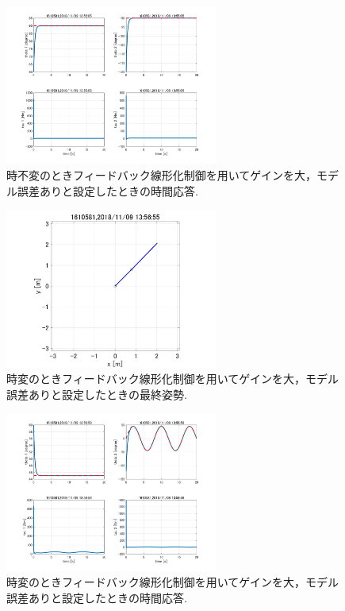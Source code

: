 \documentclass[twocolumn, 10pt,a4j]{jsarticle}
\begin{document}
    \begin{figure}[H]
      \begin{center}
        \includegraphics[width=7cm]{../img/img/kansetu_FB_zifuhen_large_yes_model_gosa_zikan_auto.jpg}
        \caption{時不変のときフィードバック線形化制御を用いてゲインを大，モデル誤差ありと設定したときの時間応答.}
      \end{center}
    \end{figure}

    \begin{figure}[H]
      \begin{center}
        \includegraphics[width=7cm]{../img/img/kansetu_FB_zihen_large_yes_model_gosa_saisyu_sisei.jpg}
        \caption{時変のときフィードバック線形化制御を用いてゲインを大，モデル誤差ありと設定したときの最終姿勢.}
      \end{center}
    \end{figure}
    
    \begin{figure}[H]
      \begin{center}
        \includegraphics[width=7cm]{../img/img/kansetu_FB_zihen_large_yes_model_gosa_zikan_auto.jpg}
        \caption{時変のときフィードバック線形化制御を用いてゲインを大，モデル誤差ありと設定したときの時間応答.}
      \end{center}
    \end{figure}
\end{document}
